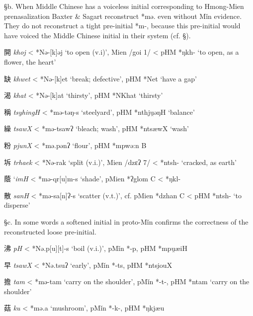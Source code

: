§b. When Middle Chinese has a voiceless initial corresponding to
Hmong-Mien prenasalization Baxter \& Sagart reconstruct *mə. even
without Mǐn evidence. They do not reconstruct a tight pre-initial *m-,
because this pre-initial would have voiced the Middle Chinese initial in
their system (cf. §).

\begin{description} \item
開  \emph{khoj} \textless{} *Nə-{[}k]{}{}əj `to open (v.i)', Mien /goi 1/
\textless{} pHM *ŋkh- `to open, as a flower, the heart'
\item
缺  \emph{khwet} \textless{} *Nə-{[}k]{}et `break; defective', pHM
*N{}et `have a gap'
\item
渴 \emph{khat} \textless{} *Nə-{[}k]{}{}at `thirsty', pHM *NKhat
`thirsty'
\item
稱 \emph{tsyhingH} \textless{} *mə-t{}əŋ-s `steelyard', pHM *nthju̯əŋH
`balance'
\item
繰 \emph{tsawX} \textless{} *mə-ts{}awʔ `bleach; wash', pHM *ntsæwX
`wash'
\item
粉 \emph{pjunX} \textless{} *mə.pənʔ `flour', pHM *mpwə:n B
\item
坼 \emph{trhaek} \textless{} *Nə-{}{}rak `split (v.i.)', Mien /dzɛʔ 7/
\textless{} *ntsh- `cracked, as earth'
\item
蔭 `\emph{imH} \textless{} *mə-qr{[}u]m-s `shade', pMien *ʔglom C
\textless{} *ŋkl-
\item
散 \emph{sanH} \textless{} *mə-s{}a[n]ʔ-s `scatter (v.t.)', cf. pMien
*dzhan C \textless{} pHM *ntsh- `to disperse'
\end{description}

§c. In some words a softened initial in proto-Mǐn confirms the
correctness of the reconstructed loose pre-initial.

\begin{description} \item
沸 \emph{p{}H} \textless{} *Nə.p{[}u]{[}t]-s `boil (v.i.)', pMǐn
*-p, pHM *mpu̯æiH
\item
早 \emph{tsawX} \textless{} *Nə.ts{}uʔ `early', pMǐn *-ts, pHM *ntsi̯ouX
\item
擔 \emph{tam} \textless{} *mə-t{}am `carry on the shoulder', pMǐn *-t-,
pHM *ntam `carry on the shoulder'
\item
菇  \emph{ku} \textless{} *mə.{}a `mushroom', pMǐn *-k-, pHM *ŋkjæu
\end{description}

